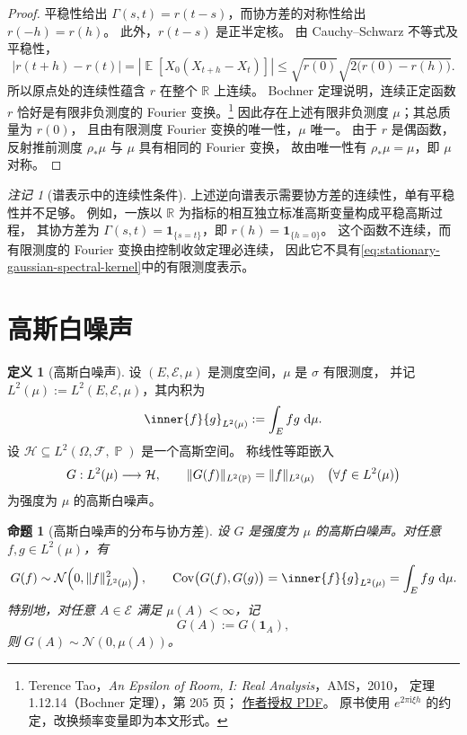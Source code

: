 \documentclass[UTF8,11pt,a4paper,oneside,fontset=fandol]{ctexrep}
\numberwithin{equation}{section}
\theoremstyle{plain}
\newtheorem{proposition}[theorem]{命题}
\theoremstyle{definition}
\newtheorem{definition}[theorem]{定义}
\theoremstyle{remark}
\newtheorem{remark}[theorem]{注记}
\newcommand{\R}{\mathbb{R}}
\newcommand{\F}{\mathcal{F}}
\newcommand{\Hcal}{\mathcal{H}}
\DeclareMathOperator{\Prob}{\mathbb{P}}
\DeclareMathOperator{\E}{\mathbb{E}}
\DeclareMathOperator{\Cov}{Cov}
\newcommand{\ind}[1]{\mathbf{1}_{#1}}
\newcommand{\dd}{\mathop{}\!\mathrm{d}}
\DeclarePairedDelimiter{\norm}{\lVert}{\rVert}
\begin{document}
\begin{proof}
平稳性给出 $\Gamma(s,t)=r(t-s)$，而协方差的对称性给出 $r(-h)=r(h)$。
此外，$r(t-s)$ 是正半定核。
由 Cauchy--Schwarz 不等式及平稳性，
\[
  |r(t+h)-r(t)|
  =|\E[X_0(X_{t+h}-X_t)]|
  \le\sqrt{r(0)}\sqrt{2\bigl(r(0)-r(h)\bigr)}.
\]
所以原点处的连续性蕴含 $r$ 在整个 $\R$ 上连续。
Bochner 定理说明，连续正定函数 $r$ 恰好是有限非负测度的 Fourier 变换。\footnote{%
Terence Tao，\emph{An Epsilon of Room, I: Real Analysis}，AMS，2010，
定理 1.12.14（Bochner 定理），第 205 页；
\href{https://terrytao.wordpress.com/wp-content/uploads/2012/12/gsm-117-tao3-epsilon1.pdf}{作者授权 PDF}。
原书使用 $e^{2\pi\mathrm i\xi h}$ 的约定，改换频率变量即为本文形式。}
因此存在上述有限非负测度 $\mu$；其总质量为 $r(0)$，
且由有限测度 Fourier 变换的唯一性，$\mu$ 唯一。
由于 $r$ 是偶函数，反射推前测度 $\rho_*\mu$ 与 $\mu$ 具有相同的 Fourier 变换，
故由唯一性有 $\rho_*\mu=\mu$，即 $\mu$ 对称。
\end{proof}

\begin{remark}[谱表示中的连续性条件]
\label{rem:bochner-continuity-needed}
上述逆向谱表示需要协方差的连续性，单有平稳性并不足够。
例如，一族以 $\R$ 为指标的相互独立标准高斯变量构成平稳高斯过程，
其协方差为 $\Gamma(s,t)=\ind{\{s=t\}}$，即 $r(h)=\ind{\{h=0\}}$。
这个函数不连续，而有限测度的 Fourier 变换由控制收敛定理必连续，
因此它不具有\cref{eq:stationary-gaussian-spectral-kernel}中的有限测度表示。
\end{remark}

\section{高斯白噪声}
\label{sec:gaussian-white-noise}

\begin{definition}[高斯白噪声]
\label{def:gaussian-white-noise}
设 $(E,\mathcal{E},\mu)$ 是测度空间，$\mu$ 是 $\sigma$ 有限测度，
并记 $L^2(\mu):=L^2(E,\mathcal{E},\mu)$，其内积为
\[
  \inner{f}{g}_{L^2(\mu)}:=\int_E fg\,\dd\mu.
\]
设 $\Hcal\subseteq L^2(\Omega,\F,\Prob)$ 是一个高斯空间。
称线性等距嵌入
\[
  G:L^2(\mu)\longrightarrow\Hcal,\qquad
  \norm{G(f)}_{L^2(\Prob)}=\norm{f}_{L^2(\mu)}
  \quad\bigl(\forall f\in L^2(\mu)\bigr)
\]
为强度为 $\mu$ 的高斯白噪声。
\end{definition}

\begin{proposition}[高斯白噪声的分布与协方差]
\label{prop:gaussian-white-noise-covariance}
设 $G$ 是强度为 $\mu$ 的高斯白噪声。对任意 $f,g\in L^2(\mu)$，有
\[
  G(f)\sim\mathcal{N}\!\left(0,\norm{f}_{L^2(\mu)}^2\right),
  \qquad
  \Cov\bigl(G(f),G(g)\bigr)
  =\inner{f}{g}_{L^2(\mu)}
  =\int_E fg\,\dd\mu.
\]
特别地，对任意 $A\in\mathcal{E}$ 满足 $\mu(A)<\infty$，记
\[
  G(A):=G(\ind{A}),
\]
则 $G(A)\sim\mathcal{N}(0,\mu(A))$。
\end{proposition}
\end{document}
